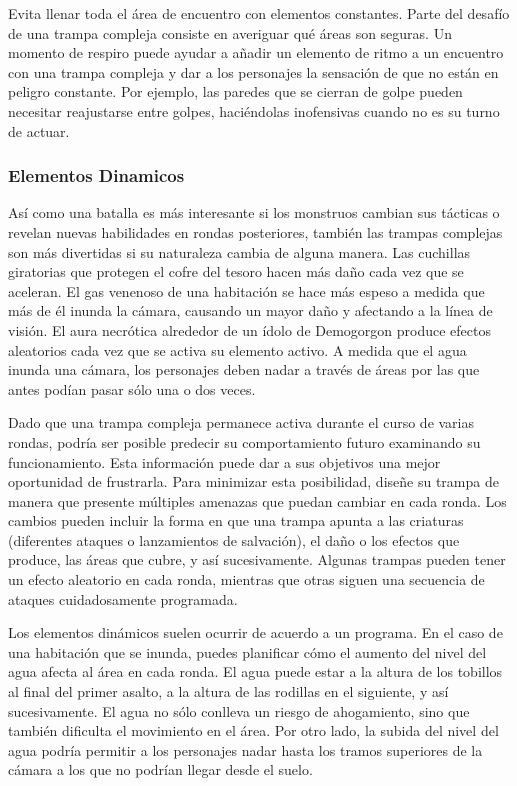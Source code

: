 \documentclass[a4paper,twocolumn,openany,10pt]{dndbook}
\begin{document}
Evita llenar toda el área de encuentro con elementos constantes. Parte del desafío de una trampa compleja consiste en averiguar
qué áreas son seguras. Un momento de respiro puede ayudar a añadir un elemento de ritmo a un encuentro con una trampa compleja y
dar a los personajes la sensación de que no están en peligro constante. Por ejemplo, las paredes que se cierran de golpe pueden
necesitar reajustarse entre golpes, haciéndolas inofensivas cuando no es su turno de actuar. 

\subsubsection*{Elementos Dinamicos}
Así como una batalla es más interesante si los monstruos cambian sus tácticas o revelan nuevas habilidades en rondas posteriores,
también las trampas complejas son más divertidas si su naturaleza cambia de alguna manera. Las cuchillas giratorias que protegen
el cofre del tesoro hacen más daño cada vez que se aceleran. El gas venenoso de una habitación se hace más espeso a medida que
más de él inunda la cámara, causando un mayor daño y afectando a la línea de visión. El aura necrótica alrededor de un ídolo de
Demogorgon produce efectos aleatorios cada vez que se activa su elemento activo. A medida que el agua inunda una cámara, los
personajes deben nadar a través de áreas por las que antes podían pasar sólo una o dos veces.

Dado que una trampa compleja permanece activa durante el curso de varias rondas, podría ser posible predecir su comportamiento
futuro examinando su funcionamiento. Esta información puede dar a sus objetivos una mejor oportunidad de frustrarla. Para
minimizar esta posibilidad, diseñe su trampa de manera que presente múltiples amenazas que puedan cambiar en cada ronda. Los
cambios pueden incluir la forma en que una trampa apunta a las criaturas (diferentes ataques o lanzamientos de salvación), el
daño o los efectos que produce, las áreas que cubre, y así sucesivamente. Algunas trampas pueden tener un efecto aleatorio en
cada ronda, mientras que otras siguen una secuencia de ataques cuidadosamente programada.

Los elementos dinámicos suelen ocurrir de acuerdo a un programa. En el caso de una habitación que se inunda, puedes planificar
cómo el aumento del nivel del agua afecta al área en cada ronda. El agua puede estar a la altura de los tobillos al final del
primer asalto, a la altura de las rodillas en el siguiente, y así sucesivamente. El agua no sólo conlleva un riesgo de
ahogamiento, sino que también dificulta el movimiento en el área. Por otro lado, la subida del nivel del agua podría permitir a
los personajes nadar hasta los tramos superiores de la cámara a los que no podrían llegar desde el suelo.
\end{document}
